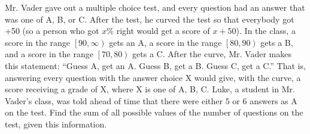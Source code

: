 Mr. Vader gave out a multiple choice test, and every question had an answer that was one of A, B, or C. After the test, he curved the test so that everybody got +50 (so a person who got $x\%$ right would get a score of $x+50$). In the class, a score in the range $\left[90,\infty\right)$ gets an A, a score in the range $\left[80,90\right)$ gets a B, and a score in the range $\left[70,80\right)$ gets a C. After the curve, Mr. Vader makes this statement: ``Guess A, get an A. Guess B, get a B. Guess C, get a C.'' That is, answering every question with the answer choice X would give, with the curve, a score receiving a grade of X, where X is one of A, B, C. Luke, a student in Mr. Vader's class, was told ahead of time that there were either $5$ or $6$ answers as A on the test. Find the sum of all possible values of the number of questions on the test, given this information.